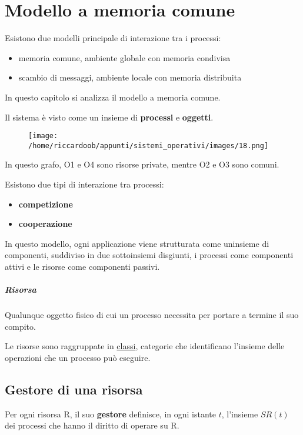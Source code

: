 \chapter{Modello a memoria comune}

Esistono due modelli principale di interazione tra i processi:
\begin{itemize}
    \item memoria comune, ambiente globale con memoria condivisa
    \item scambio di messaggi, ambiente locale con memoria distribuita
\end{itemize}

In questo capitolo si analizza il modello a memoria comune.

Il sistema è visto come un insieme di \textbf{processi} e \textbf{oggetti}.

\begin{figure}[H]
    \centering
    \texttt{[image: /home/riccardoob/appunti/sistemi\_operativi/images/18.png]}
\end{figure}

In questo grafo, O1 e O4 sono risorse private, mentre O2 e O3 sono comuni.

Esistono due tipi di interazione tra processi:
\begin{itemize}
    \item \textbf{competizione}
    \item \textbf{cooperazione}
\end{itemize}

In questo modello, ogni applicazione viene strutturata come uninsieme di componenti, suddiviso in due sottoinsiemi disgiunti, i processi come componenti attivi e le risorse come componenti passivi.

\paragraph{Risorsa} Qualunque oggetto fisico di cui un processo necessita per portare a termine il suo compito.

Le risorse sono raggruppate in \underline{classi}, categorie che identificano l'insieme delle operazioni che un processo può eseguire.

\section{Gestore di una risorsa}

Per ogni risorsa R, il suo \textbf{gestore} definisce, in ogni istante $t$, l'insieme $SR(t)$ dei processi che hanno il diritto di operare su R.

